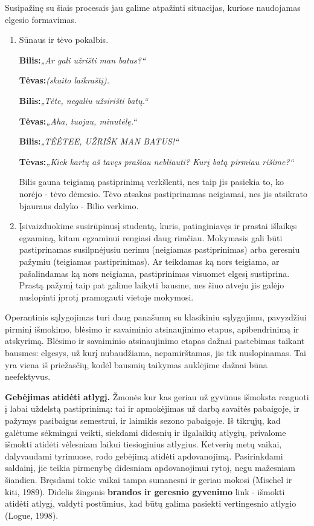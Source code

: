 \documentclass{article}
\begin{document}
Susipažinę su šiais procesais jau galime atpažinti situacijas, kuriose naudojamas elgesio formavimas.
\begin{enumerate}
\item Sūnaus ir tėvo pokalbis.

\textbf{Bilis:}\textit{„Ar gali užrišti man batus?“}

\textbf{Tėvas:}\textit{(skaito laikraštį).}

\textbf{Bilis:}\textit{„Tėte, negaliu užsirišti batų.“}

\textbf{Tėvas:}\textit{„Aha, tuojau, minutėlę.“}

\textbf{Bilis:}\textit{„TĖĖTEE, UŽRIŠK MAN BATUS!“}

\textbf{Tėvas:}\textit{„Kiek kartų aš tavęs prašiau nebliauti? Kurį batą pirmiau rišime?“}

Bilis gauna teigiamą pastiprinimą verkšlenti, nes taip jis pasiekia to, ko norėjo
- tėvo dėmesio. Tėvo atsakas pastiprinamas neigiamai, nes jis atsikrato bjauraus
dalyko - Bilio verkimo.
\item Įsivaizduokime susirūpinusį studentą, kuris, patinginiavęs ir prastai išlaikęs
egzaminą, kitam egzaminui rengiasi daug rimčiau. Mokymasis gali būti pastiprinamas
susilpnėjusiu nerimu (neigiamas pastiprinimas) arba geresniu pažymiu
(teigiamas pastiprinimas). Ar teikdamas ką nors teigiama, ar pašalindamas ką
nors neigiama, pastiprinimas visuomet elgesį sustiprina. Prastą pažymį taip pat galime laikyti bausme, nes šiuo atveju jis galėjo nuslopinti įprotį pramogauti vietoje mokymosi.
\end{enumerate}
Operantinis sąlygojimas turi daug panašumų su klasikiniu sąlygojimu, pavyzdžiui pirminį išmokimo, blėsimo ir savaiminio atsinaujinimo etapus, apibendrinimą ir atskyrimą. Blėsimo ir savaiminio atsinaujinimo etapas dažnai pastebimas taikant bausmes: elgesys, už kurį nubaudžiama, nepamirštamas, jis tik nuslopinamas. Tai yra viena iš priežasčių, kodėl bausmių taikymas auklėjime dažnai būna neefektyvus. 

\textbf{Gebėjimas atidėti atlygį.}
Žmonės kur kas geriau už gyvūnus išmoksta reaguoti į labai uždelstą pastiprinimą: tai ir apmokėjimas už darbą savaitės pabaigoje, ir pažymys pasibaigus semestrui, ir laimikis sezono pabaigoje. Iš tikrųjų, kad galėtume sėkmingai veikti, siekdami didesnių ir ilgalaikių atlygių, privalome išmokti atidėti vėlesniam laikui tiesioginius atlygius. Ketverių metų vaikai, dalyvaudami tyrimuose, rodo gebėjimą atidėti apdovanojimą. Pasirinkdami saldainį, jie teikia pirmenybę didesniam apdovanojimui rytoj, negu mažesniam šiandien. Bręsdami tokie vaikai tampa sumanesni ir geriau mokosi (Mischel ir kiti, 1989). Didelis žingsnis \textbf{brandos ir geresnio gyvenimo} link - išmokti atidėti atlygį, valdyti postūmius, kad būtų galima pasiekti vertingesnio atlygio (Logue, 1998).
\end{document}
